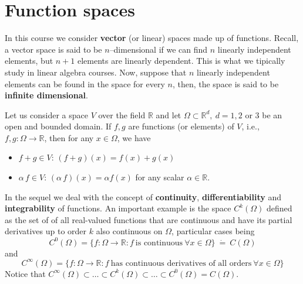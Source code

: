 \section{Function spaces} 

In this course we consider \textbf{vector} (or linear) spaces made up
of functions. Recall, a vector space is said to be $n$--dimensional if
we can find $n$ linearly independent elements, but $n+1$ elements
are linearly dependent. This is what we tipically study in
linear algebra courses. Now, suppose that $n$ linearly independent
elements can be found in the space for every $n$, then, the space
is said to be \textbf{infinite dimensional}.

Let us consider a space $V$ over the field $\mathbb{R}$
and let $\Omega \subset \mathbb{R}^d,~d=1,2$ or $3$ be
an open and bounded domain. If $f, g$ are functions (or elements)
of $V$, i.e., $f,g: \Omega \rightarrow \mathbb{R}$, then for any
$x \in \Omega$, we have 
\begin{itemize}
       \item $f + g \in V$: $(f+g)(x) = f(x) + g(x)$\ \\
       
       \item $\alpha \, f \in V$: $(\alpha \, f)(x) = \alpha f(x)$ for any scalar $\alpha \in \mathbb{R}$.
\end{itemize}

In the sequel we deal with the concept of \textbf{continuity}, \textbf{differentiability}
and \textbf{integrability} of functions.  
An important example is the space $C^k(\Omega)$ defined as the set of
of all real-valued functions that are continuous and have
its partial derivatives up to order $k$ also continuous
on $\Omega$, particular cases being
\begin{equation}
C^0(\Omega) = \{f: \Omega \rightarrow \mathbb{R} : f~\mbox{is continuous}~\forall x \in \Omega\} ~\dot{=}~ C(\Omega)
\end{equation}
and
\begin{equation}
C^{\infty}(\Omega) = \{f: \Omega \rightarrow \mathbb{R} : f~\mbox{has continuous derivatives of all orders}~\forall x \in \Omega\}
\end{equation}
Notice that $C^{\infty}(\Omega) \subset \dots \subset C^{k}(\Omega) \subset \dots \subset C^{0}(\Omega) = C(\Omega)$.


